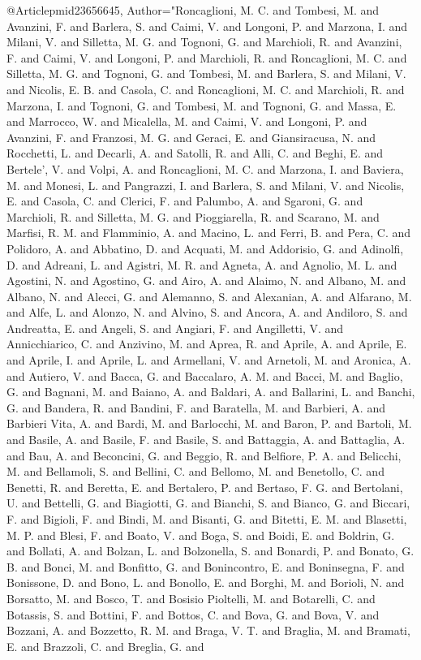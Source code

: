{{{%
@Article{pmid23656645,
   Author="Roncaglioni, M. C.  and Tombesi, M.  and Avanzini, F.  and Barlera, S.  and Caimi, V.  and Longoni, P.  and Marzona, I.  and Milani, V.  and Silletta, M. G.  and Tognoni, G.  and Marchioli, R.  and Avanzini, F.  and Caimi, V.  and Longoni, P.  and Marchioli, R.  and Roncaglioni, M. C.  and Silletta, M. G.  and Tognoni, G.  and Tombesi, M.  and Barlera, S.  and Milani, V.  and Nicolis, E. B.  and Casola, C.  and Roncaglioni, M. C.  and Marchioli, R.  and Marzona, I.  and Tognoni, G.  and Tombesi, M.  and Tognoni, G.  and Massa, E.  and Marrocco, W.  and Micalella, M.  and Caimi, V.  and Longoni, P.  and Avanzini, F.  and Franzosi, M. G.  and Geraci, E.  and Giansiracusa, N.  and Rocchetti, L.  and Decarli, A.  and Satolli, R.  and Alli, C.  and Beghi, E.  and Bertele', V.  and Volpi, A.  and Roncaglioni, M. C.  and Marzona, I.  and Baviera, M.  and Monesi, L.  and Pangrazzi, I.  and Barlera, S.  and Milani, V.  and Nicolis, E.  and Casola, C.  and Clerici, F.  and Palumbo, A.  and Sgaroni, G.  and Marchioli, R.  and Silletta, M. G.  and Pioggiarella, R.  and Scarano, M.  and Marfisi, R. M.  and Flamminio, A.  and Macino, L.  and Ferri, B.  and Pera, C.  and Polidoro, A.  and Abbatino, D.  and Acquati, M.  and Addorisio, G.  and Adinolfi, D.  and Adreani, L.  and Agistri, M. R.  and Agneta, A.  and Agnolio, M. L.  and Agostini, N.  and Agostino, G.  and Airo, A.  and Alaimo, N.  and Albano, M.  and Albano, N.  and Alecci, G.  and Alemanno, S.  and Alexanian, A.  and Alfarano, M.  and Alfe, L.  and Alonzo, N.  and Alvino, S.  and Ancora, A.  and Andiloro, S.  and Andreatta, E.  and Angeli, S.  and Angiari, F.  and Angilletti, V.  and Annicchiarico, C.  and Anzivino, M.  and Aprea, R.  and Aprile, A.  and Aprile, E.  and Aprile, I.  and Aprile, L.  and Armellani, V.  and Arnetoli, M.  and Aronica, A.  and Autiero, V.  and Bacca, G.  and Baccalaro, A. M.  and Bacci, M.  and Baglio, G.  and Bagnani, M.  and Baiano, A.  and Baldari, A.  and Ballarini, L.  and Banchi, G.  and Bandera, R.  and Bandini, F.  and Baratella, M.  and Barbieri, A.  and Barbieri Vita, A.  and Bardi, M.  and Barlocchi, M.  and Baron, P.  and Bartoli, M.  and Basile, A.  and Basile, F.  and Basile, S.  and Battaggia, A.  and Battaglia, A.  and Bau, A.  and Beconcini, G.  and Beggio, R.  and Belfiore, P. A.  and Belicchi, M.  and Bellamoli, S.  and Bellini, C.  and Bellomo, M.  and Benetollo, C.  and Benetti, R.  and Beretta, E.  and Bertalero, P.  and Bertaso, F. G.  and Bertolani, U.  and Bettelli, G.  and Biagiotti, G.  and Bianchi, S.  and Bianco, G.  and Biccari, F.  and Bigioli, F.  and Bindi, M.  and Bisanti, G.  and Bitetti, E. M.  and Blasetti, M. P.  and Blesi, F.  and Boato, V.  and Boga, S.  and Boidi, E.  and Boldrin, G.  and Bollati, A.  and Bolzan, L.  and Bolzonella, S.  and Bonardi, P.  and Bonato, G. B.  and Bonci, M.  and Bonfitto, G.  and Bonincontro, E.  and Boninsegna, F.  and Bonissone, D.  and Bono, L.  and Bonollo, E.  and Borghi, M.  and Borioli, N.  and Borsatto, M.  and Bosco, T.  and Bosisio Pioltelli, M.  and Botarelli, C.  and Botassis, S.  and Bottini, F.  and Bottos, C.  and Bova, G.  and Bova, V.  and Bozzani, A.  and Bozzetto, R. M.  and Braga, V. T.  and Braglia, M.  and Bramati, E.  and Brazzoli, C.  and Breglia, G.  and }}}}
